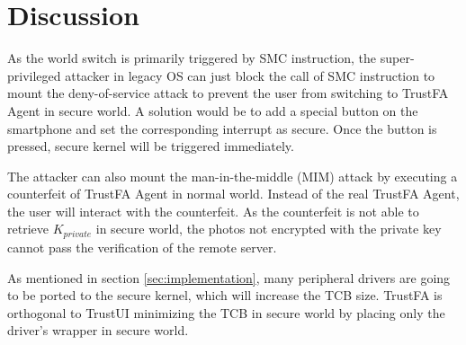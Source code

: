 \section{Discussion}
\label{sec:discussion}

As the world switch is primarily triggered by SMC instruction, the
super-privileged attacker in legacy OS can just block the call of SMC
instruction to mount the deny-of-service attack to prevent the user from
switching to TrustFA Agent in secure world. A solution would be to add a special
button on the smartphone and set the corresponding interrupt as secure. Once the
button is pressed, secure kernel will be triggered immediately.

The attacker can also mount the man-in-the-middle (MIM) attack by executing a
counterfeit of TrustFA Agent in normal world. Instead of the real TrustFA
Agent, the user will interact with the counterfeit. As the counterfeit is not
able to retrieve $K_{private}$ in secure world, the photos not encrypted with
the private key cannot pass the verification of the remote server.

As mentioned in section \ref{sec:implementation}, many peripheral drivers are
going to be ported to the secure kernel, which will increase the TCB size.
TrustFA is orthogonal to TrustUI \cite{TrustUI} minimizing the TCB in secure
world by placing only the driver's wrapper in secure world.
